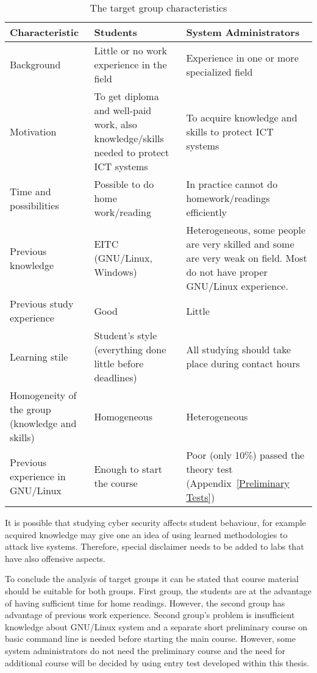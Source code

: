 \begin{table}[h]
\centering
\caption{The target group characteristics}

\begin{tabular}{|p{4cm}|p{5cm}|p{5cm}|}
\hline 
\color{blue}
Characteristic & \color{blue} Students & \color{blue} System Administrators \\ 
\hline 
Background & Little or no work experience in the field & Experience in one or more specialized field \\ 
\hline 
Motivation & To get diploma and well-paid work, also knowledge/skills needed to protect \gls{ICT} systems & To acquire  knowledge and skills to protect \gls{ICT} systems \\ 
\hline 
Time and possibilities & Possible to do home work/reading & In practice cannot do homework/readings efficiently  \\ 
\hline 
Previous knowledge &  \gls{EITC} (GNU/Linux, Windows)  &  Heterogeneous, some people are very skilled and some are very weak on field. Most  do not have proper GNU/Linux experience.  \\ 
\hline 
Previous study experience & Good & Little \\ 
\hline 
Learning stile & Student's style (everything done little before deadlines) & All studying should take place during contact hours  \\ 
\hline 
Homogeneity of the group (knowledge and skills) & Homogeneous & Heterogeneous \\ 
\hline 
Previous experience in GNU/Linux & Enough to start the course & Poor (only 10\%) passed the theory test (Appendix~\ref{Preliminary Tests})  \\ 
\hline 
\end{tabular} 

\label{tab:targetgroup}
\end{table}
 
It  is possible that studying cyber security affects student behaviour, for example acquired knowledge may give one an idea of using learned methodologies to attack live systems. Therefore, special disclaimer needs to be added to labs that have also offensive aspects.
 
To conclude the analysis of target groups it can be stated that course material should be suitable for both groups. First group, the students are at the advantage of having sufficient time for home readings. However, the second group has advantage of previous work experience. Second group's problem is insufficient knowledge about GNU/Linux system and a separate short preliminary course on basic command line is needed before starting the main course. However, some system administrators do not need the preliminary course and the need for additional course will be decided by using entry test developed within this thesis.


